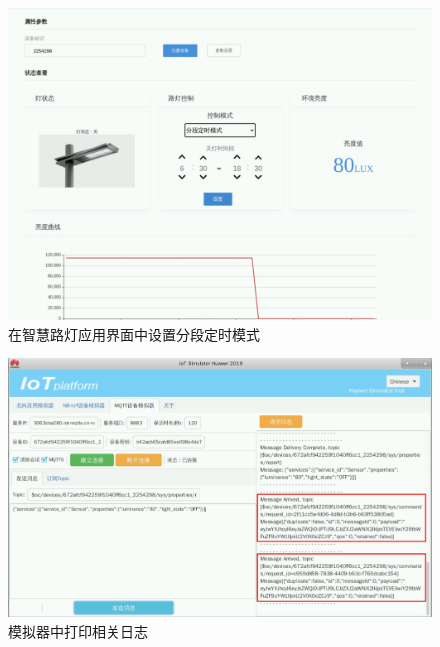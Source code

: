 \begin{figure}[!htbp]
\centering
\includegraphics[width=\textwidth]{figures/序列 01.00_28_20_37.Still027.png}
\caption{在智慧路灯应用界面中设置分段定时模式}\label{在智慧路灯应用界面中设置分段定时模式}
\end{figure}

\begin{figure}[!htbp]
\centering
\includegraphics[width=\textwidth]{figures/序列 01.00_28_52_01.Still028.png}
\caption{模拟器中打印相关日志}\label{模拟器中打印相关日志2}
\end{figure}
